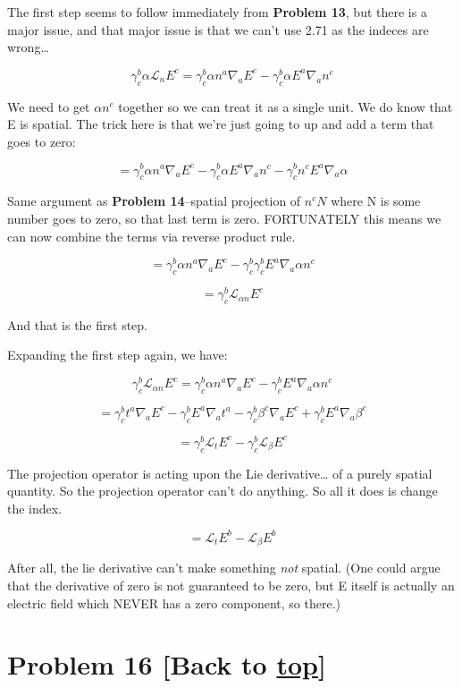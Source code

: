 \documentclass[landscape,letterpaper,10pt,english]{article}
\begin{document}
    The first step seems to follow immediately from \textbf{Problem 13}, but
there is a major issue, and that major issue is that we can't use 2.71
as the indeces are wrong\ldots{}

\[\gamma^b_c \alpha \mathcal{L}_n E^c = \gamma^b_c \alpha n^a \nabla_a E^c - \gamma^b_c \alpha E^a \nabla_a n^c\]

We need to get \(\alpha n^c\) together so we can treat it as a single
unit. We do know that E is spatial. The trick here is that we're just
going to up and add a term that goes to zero:

\[ = \gamma^b_c \alpha n^a \nabla_a E^c - \gamma^b_c \alpha E^a \nabla_a n^c - \gamma^b_c n^c E^a \nabla_a \alpha \]

Same argument as \textbf{Problem 14}--spatial projection of \(n^c N\)
where N is some number goes to zero, so that last term is zero.
FORTUNATELY this means we can now combine the terms via reverse product
rule.

\[ = \gamma^b_c \alpha n^a \nabla_a E^c - \gamma^b_c \gamma^b_c E^a \nabla_a \alpha n^c \]

\[ = \gamma^b_c \mathcal{L}_{\alpha n} E^c \]

And that is the first step.

    Expanding the first step again, we have:

\[\gamma^b_c \mathcal{L}_{\alpha n} E^c =  \gamma^b_c \alpha n^a \nabla_a E^c - \gamma^b_c E^a \nabla_a \alpha n^c\]

\[ =  \gamma^b_c t^a \nabla_a E^c - \gamma^b_c E^a \nabla_a t^a - \gamma^b_c \beta^c \nabla_a E^c + \gamma^b_c E^a \nabla_a \beta^c\]

\[ =  \gamma^b_c \mathcal{L}_t E^c - \gamma^b_c \mathcal{L}_\beta E^c\]

The projection operator is acting upon the Lie derivative\ldots{} of a
purely spatial quantity. So the projection operator can't do anything.
So all it does is change the index.

\[ = \mathcal{L}_t E^b - \mathcal{L}_\beta E^b\]

After all, the lie derivative can't make something \emph{not} spatial.
(One could argue that the derivative of zero is not guaranteed to be
zero, but E itself is actually an electric field which NEVER has a zero
component, so there.)

    \hypertarget{problem-16-back-to-top}{%
\section{\texorpdfstring{Problem 16 {[}Back to
\hyperref[toc]{top}{]}}{Problem 16 {[}Back to {]}}}\label{problem-16-back-to-top}}
\end{document}
